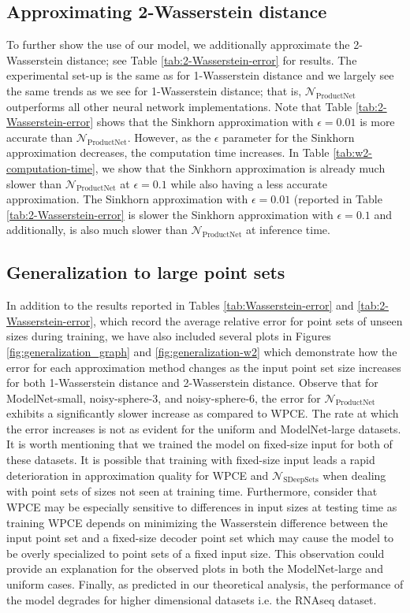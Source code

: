 \documentclass[12pt]{article}
\newcommand{\Network}{\mathcal{N}_{\mathrm{ProductNet}}}
\begin{document}
\subsection{Approximating 2-Wasserstein distance}
To further show the use of our model, we additionally approximate the 2-Wasserstein distance; see Table \ref{tab:2-Wasserstein-error} for results. The experimental set-up is the same as for 1-Wasserstein distance and we largely see the same trends as we see for 1-Wasserstein distance; that is, $\mathcal{N}_{\mathrm{ProductNet}}$ outperforms all other neural network implementations. Note that Table \ref{tab:2-Wasserstein-error} shows that the Sinkhorn approximation with $\epsilon = 0.01$ is more accurate than $\mathcal{N}_{\mathrm{ProductNet}}$. However, as the $\epsilon$ parameter for the Sinkhorn approximation decreases, the computation time increases. In Table \ref{tab:w2-computation-time}, we show that the Sinkhorn approximation is already much slower than $\mathcal{N}_{\mathrm{ProductNet}}$ at $\epsilon = 0.1$ while also having a less accurate approximation. The Sinkhorn approximation with $\epsilon = 0.01$ (reported in Table \ref{tab:2-Wasserstein-error} is slower the Sinkhorn approximation with $\epsilon = 0.1$ and additionally, is also much slower than $\mathcal{N}_{\mathrm{ProductNet}}$ at inference time. 

\subsection{Generalization to large point sets}
In addition to the results reported in Tables \ref{tab:Wasserstein-error} and \ref{tab:2-Wasserstein-error}, which record the average relative error for point sets of unseen sizes during training, we have also included several plots in Figures \ref{fig:generalization_graph} and \ref{fig:generalization-w2} which demonstrate how the error for each approximation method changes as the input point set size increases for both 1-Wasserstein distance and 2-Wasserstein distance. Observe that for ModelNet-small, noisy-sphere-3, and noisy-sphere-6, the error for $\Network$ exhibits a significantly slower increase as compared to WPCE. 
The rate at which the error increases is not as evident for the uniform and ModelNet-large datasets. 
It is worth mentioning that we trained the model on fixed-size input for both of these datasets. 
It is possible that training with fixed-size input leads a rapid deterioration in approximation quality for WPCE and $\mathcal{N}_{\mathrm{SDeepSets}}$ when dealing with point sets of sizes not seen at training time. 
Furthermore, consider that WPCE may be especially sensitive to differences in input sizes at testing time as training WPCE depends on minimizing the Wasserstein difference between the input point set and a fixed-size decoder point set which may cause the model to be overly specialized to point sets of a fixed input size. 
This observation could provide an explanation for the observed plots in both the ModelNet-large and uniform cases.
Finally, as predicted in our theoretical analysis, the performance of the model degrades for higher dimensional datasets i.e. the RNAseq dataset. 
\end{document}
